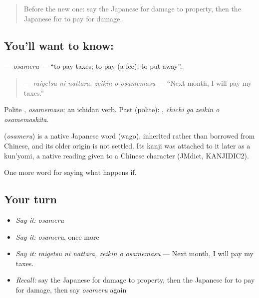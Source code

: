 \begin{quote}
Before the new one: say the Japanese for damage to property, then the Japanese for to pay for damage.
\end{quote}

\subsection*{You'll want to know: }
\textbf{} — \emph{osameru} — \textquotedblleft{}to pay taxes; to pay (a fee); to put away\textquotedblright{}.

\begin{quote}
\textbf{  } — \emph{raigetsu ni nattara, zeikin o osamemasu} — \textquotedblleft{}Next month, I will pay my taxes.\textquotedblright{}
\end{quote}

Polite \textbf{}, \emph{osamemasu}; an ichidan verb. Past (polite): \textbf{  }, \emph{chichi ga zeikin o osamemashita}.

\begin{cousinweb}
\textbf{} (\emph{osameru}) is a native Japanese word (wago), inherited rather than borrowed from Chinese, and its older origin is not settled. Its kanji was attached to it later as a kun'yomi, a native reading given to a Chinese character (JMdict, KANJIDIC2).
\end{cousinweb}

\begin{grammarlens}[title={What you've built}]
One more word for saying what happens if.
\end{grammarlens}

\subsection*{Your turn}
\begin{itemize}
\raggedright
  \item \emph{Say it:} \emph{osameru}
  \item \emph{Say it:} \emph{osameru}, once more
  \item \emph{Say it:} \emph{raigetsu ni nattara, zeikin o osamemasu} — Next month, I will pay my taxes.
  \item \emph{Recall:} say the Japanese for damage to property, then the Japanese for to pay for damage, then say \emph{osameru} again
\end{itemize}

